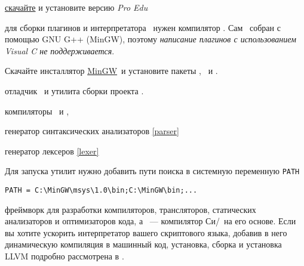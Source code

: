 \label{install}

\begin{description}
	\item{\vrep} \href{http://www.coppeliarobotics.com/downloads.html}{скачайте}
		и установите версию \emph{Pro Edu}

	\item{} для сборки плагинов и интерпретатора \bi\ нужен 
		компилятор \cpp. Сам \vrep\ собран с помощью GNU G++ (MinGW), поэтому
		\emph{написание плагинов с использованием Visual C не поддерживается}.
		
		Скачайте инсталлятор
		\href{http://www.mingw.org/}{MinGW}\ и установите пакеты
		, \ и . 





		отладчик \ и утилита сборки проекта .

		компиляторы \ и \note{\cpp},


		генератор синтаксических анализаторов \ref{parser}

		генератор лексеров \ref{lexer}


Для запуска утилит нужно добавить пути поиска в системную переменную \verb|PATH|



\verb|PATH = C:\MinGW\msys\1.0\bin;C:\MinGW\bin;...|

\item{} фреймворк для разработки компиляторов, трансляторов,
статических анализаторов и оптимизаторов кода, а \ --- компилятор
Си/\cpp\ на его основе. Если вы хотите ускорить интерпретатор вашего скриптового
языка, добавив в него динамическую компиляция в машинный код, установка, сборка
и установка LLVM подробно рассмотрена в \cite{lexman}.

\end{description}

